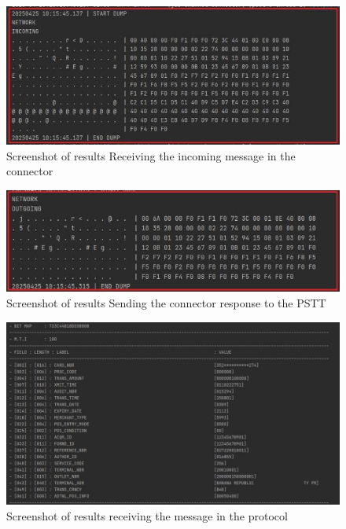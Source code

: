 \documentclass[12pt,a4paper]{report}
\begin{document}
\begin{figure}[H]
\centering
\includegraphics[width=\textwidth,height=\textheight,keepaspectratio]{media/image77.jpeg}
\caption{Screenshot of results
Receiving the incoming message in the connector}
\label{fig:RIMC}
\end{figure} 


\begin{figure}[H]
\centering
\includegraphics[width=\textwidth,height=\textheight,keepaspectratio]{media/image78.jpeg}
\caption{Screenshot of results
Sending the connector response to the PSTT}
\label{fig:SCRP}
\end{figure} 




\begin{figure}[H]
\centering
\includegraphics[width=\textwidth,height=\textheight,keepaspectratio]{media/image79.jpeg}
\caption{Screenshot of results
receiving the message in the protocol}
\label{fig:RRMP}
\end{figure} 
\end{document}
